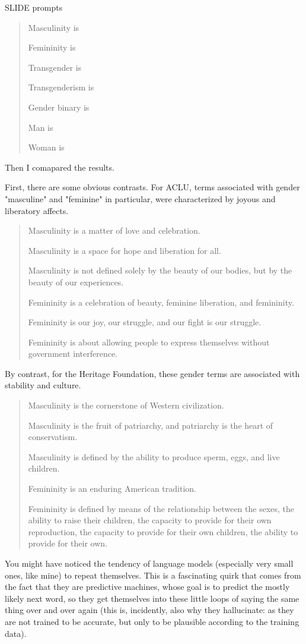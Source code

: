 \documentclass[11pt]{article}
\begin{document}
SLIDE prompts

\begin{quote}
Masculinity is

Femininity is

Transgender is

Transgenderism is

Gender binary is

Man is

Woman is
\end{quote}

Then I comapared the results. 

First, there are some obvious contrasts. For ACLU, terms associated
with gender "masculine" and "feminine" in particular, were
characterized by joyous and liberatory affects.

\begin{quote}
Masculinity is a matter of love and celebration.

Masculinity is a space for hope and liberation for all.

Masculinity is not defined solely by the beauty of our bodies, but by
the beauty of our experiences.

Femininity is a celebration of beauty, feminine liberation, and
femininity.

Femininity is our joy, our struggle, and our fight is our struggle.

Femininity is about allowing people to express themselves without
government interference.
\end{quote}

By contrast, for the Heritage Foundation, these gender terms are
associated with stability and culture. 

\begin{quote}
Masculinity is the cornerstone of Western civilization.

Masculinity is the fruit of patriarchy, and patriarchy is the heart
of conservatism.

Masculinity is defined by the ability to produce sperm, eggs, and live
children.

Femininity is an enduring American tradition.

Femininity is defined by means of the relationship between the sexes,
the ability to raise their children, the capacity to provide for their
own reproduction, the capacity to provide for their own children, the
ability to provide for their own.
\end{quote}

You might have noticed the tendency of language models (especially
very small ones, like mine) to repeat themselves. This is a
fascinating quirk that comes from the fact that they are predictive
machines, whose goal is to predict the mostly likely next word, so
they get themselves into these little loops of saying the same thing
over and over again (this is, incidently, also why they hallucinate:
as they are not trained to be accurate, but only to be plausible
according to the training data). 
\end{document}

